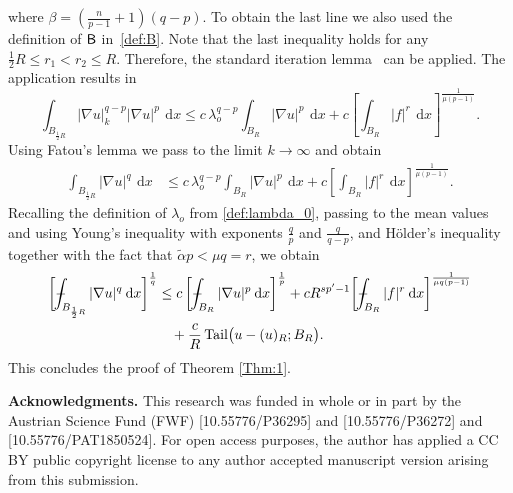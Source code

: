 \documentclass[10pt,letterpaper]{amsart}
\theoremstyle{definition}
\numberwithin{theorem}{section}
\numberwithin{equation}{section}
\newcommand{\1}{\ensuremath{\mathds{1}}}
\def\Xint#1{\mathchoice
    {\XXint\displaystyle\textstyle{#1}}%
    {\XXint\textstyle\scriptstyle{#1}}%
    {\XXint\scriptstyle\scriptscriptstyle{#1}}%
    {\XXint\scriptscriptstyle\scriptscriptstyle{#1}}%
    \!\int}
\def\XXint#1#2#3{\setbox0=\hbox{$#1{#2#3}{\int}$}
    \vcenter{\hbox{$#2#3$}}\kern-0.5\wd0}
\def\bint{\Xint-}
\renewcommand{\d}{\:\! \mathrm{d}}
\numberwithin{equation}{section}
\begin{document}
where $\beta = (\frac{n}{p-1}+1)(q-p)$. To obtain the last line we also used the definition of $\sf B$ in~\eqref{def:B}. Note that the last inequality holds for any $\frac12 R \le r_1<r_2\le R$. Therefore, the standard iteration lemma~\cite[Lemma 6.1]{Giusti} can be applied. The application results in
\begin{equation*}
     \int_{B_{\frac12 R}} |\nabla u|_k^{q-p} |\nabla u|^p  \, \d x
     \le
     c\,
     \lambda_o^{q-p} \int_{B_R} |\nabla u|^p \, \d x + c  \left[ \int_{B_R} |f|^{r} \, \d x \right]^\frac{1}{\mu (p-1)}.
\end{equation*}
Using Fatou's lemma we pass to the limit  $k \to \infty$ and obtain
\begin{align*}
    \int_{B_{\frac12 R}} |\nabla u|^{q}  \, \d x  
    &\leq 
    c\, \lambda_o^{q-p} \int_{B_R} |\nabla u|^p \, \d x + 
    c \left[ \int_{B_R} |f|^{r} \, \d x \right]^\frac{1}{\mu (p-1)}.
\end{align*}
Recalling the definition of $\lambda_o$ from \eqref{def:lambda_0}, passing to the mean values and using Young's inequality with exponents $\frac{q}{p}$ and $\frac{q}{q-p}$, and H\"older's inequality together with the fact that $\tilde \alpha p < \mu q=r$, we obtain
\begin{align*}
    \bigg[ \bint_{B_{\frac12 R}} |\nabla u|^{q} \, \d x \bigg]^\frac{1}{q}
    &\leq 
    c \,\bigg[\bint_{B_{R}}  |\nabla u|^p  \, \d x\bigg]^\frac{1}{p} + c R^{sp'-1}\bigg[ \bint_{B_R} |f|^{r} \, \d x \bigg]^\frac{1}{\mu q(p-1)} \\
    &\phantom{\le\,} + \frac{c}{R} \, \mathrm{Tail} \big(u-(u)_{R};B_R\big).
\end{align*}
This concludes the proof of Theorem \ref{Thm:1}.


\medskip
\noindent
{\bf Acknowledgments.}  
This research was funded in whole or in part by the Austrian Science Fund (FWF) [10.55776/P36295] and [10.55776/P36272] and [10.55776/PAT1850524]. For open access purposes, the author has applied a CC BY public copyright license to any author accepted manuscript version arising from this submission.
\end{document}
